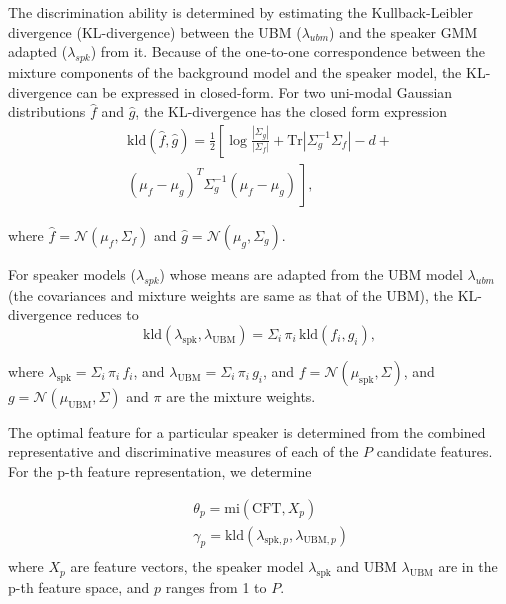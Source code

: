 \documentclass{article}
\begin{document}
The discrimination ability is determined by estimating the Kullback-Leibler divergence (KL-divergence) between the UBM ($\lambda_{ubm}$) and the speaker GMM adapted ($\lambda_{spk}$) from it. Because of the one-to-one
correspondence between the mixture components of the background model and the speaker model, the KL-divergence can be expressed in closed-form. For two uni-modal Gaussian distributions $\hat{f}$ and $\hat{g}$, the KL-divergence has the closed form expression
\begin{equation}
\begin{split}
\textrm{kld}(\hat{f},\hat{g}) = \frac{1}{2}\left[ \log \frac{|\Sigma_g|}{|\Sigma_f|} +
	\textrm{Tr}|\Sigma^{-1}_g\Sigma_f| - d + \right. \\ 
\left. (\mu_f-\mu_g)^T\Sigma_g^{-1}(\mu_f-\mu_g) \frac{}{} \right], 
\end{split}
\label{eq:kldGaussians}
\end{equation}

where $\hat{f} = \mathcal{N}(\mu_f,\Sigma_f)$ and $\hat{g} = \mathcal{N}(\mu_g,\Sigma_g)$.

For speaker models ($\lambda_{spk}$) whose means are adapted from the UBM model $\lambda_{ubm}$ (the covariances and mixture weights are same as that of the UBM), the KL-divergence reduces to 
\begin{equation}
\textrm{kld}(\lambda_{\textrm{spk}},\lambda_{\textrm{UBM}}) = 
	\Sigma_i\, \pi_i\, \textrm{kld}(f_i,g_i),
\label{eq:gmmAdaptedKLD}
\end{equation}


where $\lambda_{\textrm{spk}} = \Sigma_i \, \pi_i \, f_i$, and
$\lambda_{\textrm{UBM}} = \Sigma_i \, \pi_i \, g_i$, and
$f = \mathcal{N}(\mu_{\textrm{spk}},\Sigma)$, and
$g = \mathcal{N}(\mu_{\textrm{UBM}},\Sigma)$ and
$\pi$ are the mixture weights.


The optimal feature for a particular speaker is determined from the combined
representative and discriminative measures of each of the $P$ candidate
features. For the p-th feature representation, we determine

\begin{eqnarray*}
&& \theta_p = \textrm{mi}(\textrm{CFT},X_{p}) \\ && \gamma_p =
\textrm{kld}(\lambda_{\textrm{spk},p},\lambda_{\textrm{UBM},p}) \\
\end{eqnarray*} 
where $X_p$ are feature vectors, the speaker model $\lambda_{\textrm{spk}}$ and 
UBM $\lambda_{\textrm{UBM}}$ are in the p-th feature space, and $p$ ranges from 1 to $P$.
\end{document}
